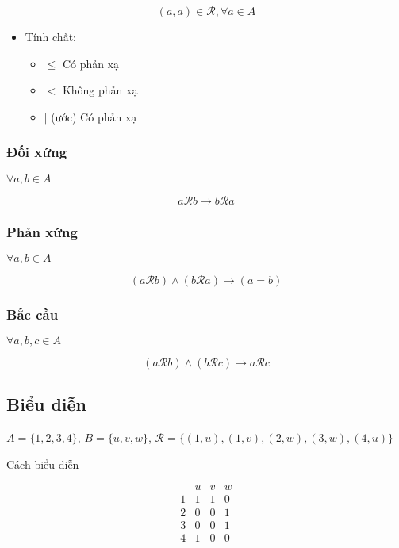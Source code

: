 \documentclass[11pt]{article}
\providecommand{\tightlist}{%
      \setlength{\itemsep}{0pt}\setlength{\parskip}{0pt}}
\begin{document}
    \[
(a,a) \in \mathcal{R}, \forall a \in A
\]

\begin{itemize}
\item
  Tính chất:

  \begin{itemize}
  \tightlist
  \item
    \(\leq\) Có phản xạ
  \item
    \(<\) Không phản xạ
  \item
    \(\mid\) (ước) Có phản xạ
  \end{itemize}
\end{itemize}

    \subsubsection{Đối xứng}\label{ux111ux1ed1i-xux1ee9ng}

    \(\forall a, b \in A\)

\[
a \mathcal{R} b \to b \mathcal{R} a
\]

    \subsubsection{Phản xứng}\label{phux1ea3n-xux1ee9ng}

    \(\forall a, b \in A\)

\[
(a \mathcal{R} b) \land (b \mathcal{R} a) \to (a = b)
\]

    \subsubsection{Bắc cầu}\label{bux1eafc-cux1ea7u}

    \(\forall a, b, c \in A\)

\[
(a \mathcal{R} b) \land (b \mathcal{R} c) \to a \mathcal{R} c
\]

    \subsection{Biểu diễn}\label{biux1ec3u-diux1ec5n}

    \(A = \{ 1,2,3,4\}\), \(B = \{ u, v, w\}\),
\(\mathcal{R} = \{ (1,u), (1,v),(2,w),(3,w),(4,u) \}\)

Cách biểu diễn

\[
\begin{array}{c|ccc}
 & u & v & w \\
\hline
1 & 1 & 1 & 0 \\
2 & 0 & 0 & 1 \\
3 & 0 & 0 & 1 \\
4 & 1 & 0 & 0 \\
\end{array}
\]
\end{document}
